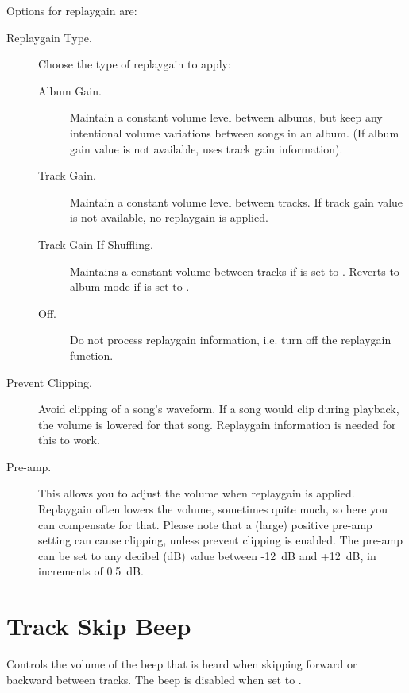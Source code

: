 {    Options for replaygain are:
    \begin{description}
      \item[Replaygain Type.] Choose the type of replaygain to apply:
        \begin{description}
        \item[Album Gain.] Maintain a constant volume level between
          albums, but keep any intentional volume variations between 
          songs in an album. (If album gain value is not available,
          uses track gain information).
        \item[Track Gain.] Maintain a constant volume level between
          tracks. If track gain value is not available, no replaygain 
          is applied.
        \item[Track Gain If Shuffling.] Maintains a constant volume
          between tracks if  is set to .
          Reverts to album mode if  is set to .
        \item[Off.] Do not process replaygain information, i.e. turn off
          the replaygain function.
        \end{description}
      \item[Prevent Clipping.] Avoid clipping of a song's waveform.
        If a song would clip during playback, the volume is lowered for 
        that song. Replaygain information is needed for this to work.
      \item[Pre-amp.] This allows you to adjust the volume when replaygain
        is applied. Replaygain often lowers the volume, sometimes quite
        much, so here you can compensate for that. Please note that a
        (large) positive pre-amp setting can cause clipping, unless
        prevent clipping is enabled.  The pre-amp can be set to any
        decibel (dB) value between -12~dB and +12~dB, in increments of 0.5~dB.
      \end{description}

  \section{Track Skip Beep}
    Controls the volume of the beep that is heard when
    skipping forward or backward between tracks. The beep is disabled when
    set to .
}%


